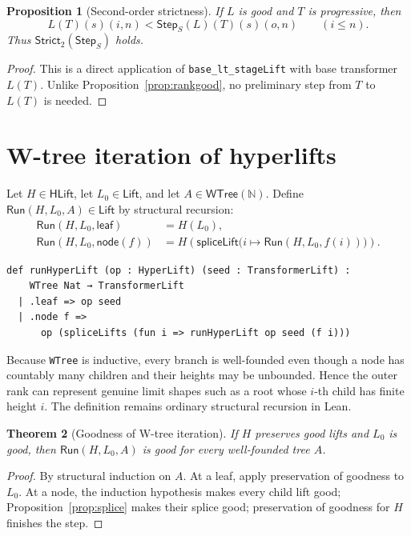 \documentclass[11pt]{article}
\newtheorem{theorem}{Theorem}[section]
\newtheorem{proposition}[theorem]{Proposition}
\theoremstyle{definition}
\theoremstyle{remark}
\newcommand{\N}{\mathbb{N}}
\newcommand{\code}[1]{\texttt{#1}}
\newcommand{\Lift}{\mathsf{Lift}}
\newcommand{\HLift}{\mathsf{HLift}}
\newcommand{\Step}{\mathsf{Step}}
\newcommand{\Run}{\mathsf{Run}}
\newcommand{\WTree}{\mathsf{WTree}}
\begin{document}
\begin{proposition}[Second-order strictness]\label{prop:rankstrict2}
If \(L\) is good and \(T\) is progressive, then
\[
L(T)(s)(i,n)<\Step_S(L)(T)(s)(o,n)
\qquad(i\le n).
\]
Thus \(\mathsf{Strict}_2(\Step_S)\) holds.
\end{proposition}

\begin{proof}
This is a direct application of \code{base\_lt\_stageLift} with base
transformer \(L(T)\).  Unlike Proposition~\ref{prop:rankgood}, no preliminary
step from \(T\) to \(L(T)\) is needed.
\end{proof}

\section{W-tree iteration of hyperlifts}

Let \(H\in\HLift\), let \(L_0\in\Lift\), and let \(A\in\WTree(\N)\).  Define
\(\Run(H,L_0,A)\in\Lift\) by structural recursion:
\begin{align*}
\Run(H,L_0,\mathsf{leaf})
  &=H(L_0),\\
\Run(H,L_0,\mathsf{node}(f))
  &=H\left(\mathsf{spliceLift}
      \bigl(i\mapsto\Run(H,L_0,f(i))\bigr)\right).
\end{align*}

\begin{lstlisting}
def runHyperLift (op : HyperLift) (seed : TransformerLift) :
    WTree Nat → TransformerLift
  | .leaf => op seed
  | .node f =>
      op (spliceLifts (fun i => runHyperLift op seed (f i)))
\end{lstlisting}

Because \code{WTree} is inductive, every branch is well-founded even though a
node has countably many children and their heights may be unbounded.  Hence the
outer rank can represent genuine limit shapes such as a root whose \(i\)-th
child has finite height \(i\).  The definition remains ordinary structural
recursion in Lean.

\begin{theorem}[Goodness of W-tree iteration]\label{thm:rungood}
If \(H\) preserves good lifts and \(L_0\) is good, then
\(\Run(H,L_0,A)\) is good for every well-founded tree \(A\).
\end{theorem}

\begin{proof}
By structural induction on \(A\).  At a leaf, apply preservation of goodness to
\(L_0\).  At a node, the induction hypothesis makes every child lift good;
Proposition~\ref{prop:splice} makes their splice good; preservation of goodness
for \(H\) finishes the step.
\end{proof}
\end{document}
